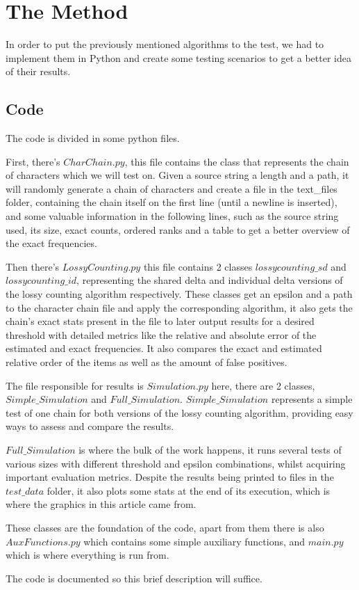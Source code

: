 \documentclass[...]{revdetua}
\begin{document}
\section{The Method}
In order to put the previously mentioned algorithms to the test, we had to implement them in Python and create some testing scenarios to get a better idea of their results.
\subsection{Code}
The code is divided in some python files.\par
First, there's $CharChain.py$, this file contains the class that represents the chain of characters which we will test on. Given a source string a length and a path, it will randomly generate a chain of characters and create a file in the text\_files folder, containing the chain itself on the first line (until a newline is inserted), and some valuable information in the following lines, such as the source string used, its size, exact counts, ordered ranks and a table to get a better overview of the exact frequencies.\par
Then there's $LossyCounting.py$ this file contains 2 classes $lossycounting\_sd$ and $lossycounting\_id$, representing the shared delta and individual delta versions of the lossy counting algorithm respectively. These classes get an epsilon and a path to the character chain file and apply the corresponding algorithm, it also gets the chain's exact stats present in the file to later output results for a desired threshold with detailed metrics like the relative and absolute error of the estimated and exact frequencies. It also compares the exact and estimated relative order of the items as well as the amount of false positives.\par
The file responsible for results is $Simulation.py$ here, there are 2 classes, $Simple\_Simulation$ and $Full\_Simulation$.
$Simple\_Simulation$ represents a simple test of one chain for both versions of the lossy counting algorithm, providing easy ways to assess and compare the results.\par
$Full\_Simulation$ is where the bulk of the work happens, it runs several tests of various sizes with different threshold and epsilon combinations, whilst acquiring important evaluation metrics. Despite the results being printed to files in the $test\_data$ folder, it also plots some stats at the end of its execution, which is where the graphics in this article came from.\par
These classes are the foundation of the code, apart from them there is also $AuxFunctions.py$ which contains some simple auxiliary functions, and $main.py$ which is where everything is run from.\par
The code is documented so this brief description will suffice.
\end{document}

